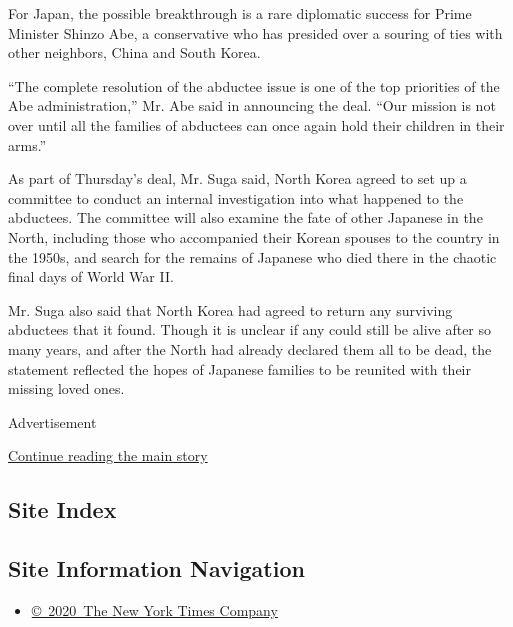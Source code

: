 For Japan, the possible breakthrough is a rare diplomatic success for
Prime Minister Shinzo Abe, a conservative who has presided over a
souring of ties with other neighbors, China and South Korea.

``The complete resolution of the abductee issue is one of the top
priorities of the Abe administration,'' Mr. Abe said in announcing the
deal. ``Our mission is not over until all the families of abductees can
once again hold their children in their arms.''

As part of Thursday's deal, Mr. Suga said, North Korea agreed to set up
a committee to conduct an internal investigation into what happened to
the abductees. The committee will also examine the fate of other
Japanese in the North, including those who accompanied their Korean
spouses to the country in the 1950s, and search for the remains of
Japanese who died there in the chaotic final days of World War II.

Mr. Suga also said that North Korea had agreed to return any surviving
abductees that it found. Though it is unclear if any could still be
alive after so many years, and after the North had already declared them
all to be dead, the statement reflected the hopes of Japanese families
to be reunited with their missing loved ones.

Advertisement

\protect\hyperlink{after-bottom}{Continue reading the main story}

\hypertarget{site-index}{%
\subsection{Site Index}\label{site-index}}

\hypertarget{site-information-navigation}{%
\subsection{Site Information
Navigation}\label{site-information-navigation}}

\begin{itemize}
\tightlist
\item
  \href{https://help.nytimes3xbfgragh.onion/hc/en-us/articles/115014792127-Copyright-notice}{©~2020~The
  New York Times Company}
\end{itemize}

